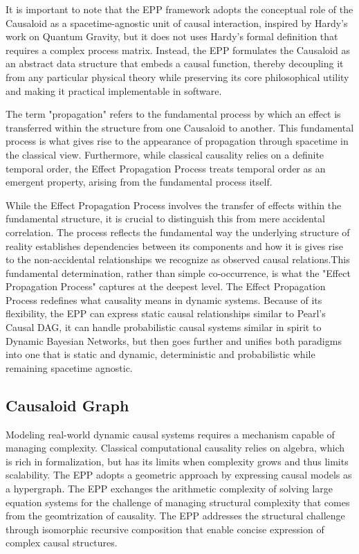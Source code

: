 It is important to note that the EPP framework adopts the conceptual role of the Causaloid as a spacetime-agnostic unit of causal interaction, inspired by Hardy’s work on Quantum Gravity, but it does not uses Hardy's formal definition that requires a complex process matrix. Instead, the EPP formulates the Causaloid as an abstract data structure that embeds a causal function, thereby decoupling it from any particular physical theory while preserving its core philosophical utility and making it practical implementable in software.

The term "propagation" refers to the fundamental process by which an effect is transferred within the structure from one Causaloid to another. This fundamental process is what gives rise to the appearance of propagation through spacetime in the classical view. Furthermore, while classical causality relies on a definite temporal order, the Effect Propagation Process treats temporal order as an emergent property, arising from the fundamental process itself.

While the Effect Propagation Process involves the transfer of effects within the fundamental structure, it is crucial to distinguish this from mere accidental correlation. The process reflects the fundamental way the underlying structure of reality establishes dependencies between its components and how it is gives rise to the non-accidental relationships we recognize as observed causal relations.This fundamental determination, rather than simple co-occurrence, is what the "Effect Propagation Process" captures at the deepest level. The Effect Propagation Process redefines what causality means in dynamic systems. Because of its flexibility, the EPP can express static causal relationships similar to Pearl’s Causal DAG, it can handle probabilistic causal systems similar in spirit to Dynamic Bayesian Networks, but then goes further and unifies both paradigms into one that is static and dynamic, deterministic and probabilistic while remaining spacetime agnostic.

\newpage

\subsection{Causaloid Graph}
\label{sec:epp_causaloid_graph}

Modeling real-world dynamic causal systems requires a mechanism capable of managing complexity.
Classical computational causality relies on algebra, which is rich in formalization,
but has its limits when complexity grows and thus limits scalability. The EPP adopts
a geometric approach by expressing causal models as a hypergraph. The EPP
exchanges the arithmetic complexity of solving large equation systems for the challenge of managing structural complexity that comes from the geomtrization of causality.
The EPP addresses the structural challenge through isomorphic recursive composition
that enable concise expression of complex causal structures.

